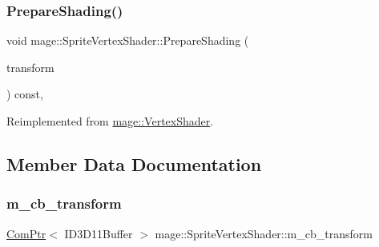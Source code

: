 \subsubsection{\texorpdfstring{Prepare\+Shading()}{PrepareShading()}}
{\footnotesize\ttfamily void mage\+::\+Sprite\+Vertex\+Shader\+::\+Prepare\+Shading (\begin{DoxyParamCaption}\item[{const X\+M\+M\+A\+T\+R\+IX \&}]{transform }\end{DoxyParamCaption}) const\hspace{0.3cm}{\ttfamily [override]}, {\ttfamily [virtual]}}



Reimplemented from \hyperlink{classmage_1_1_vertex_shader_a928e013248cf9c7cf17923bd6ff6a3e6}{mage\+::\+Vertex\+Shader}.



\subsection{Member Data Documentation}
\hypertarget{classmage_1_1_sprite_vertex_shader_a8d8f7c137da98c64d79d277400750637}{}\label{classmage_1_1_sprite_vertex_shader_a8d8f7c137da98c64d79d277400750637} 
\subsubsection{\texorpdfstring{m\+\_\+cb\+\_\+transform}{m\_cb\_transform}}
{\footnotesize\ttfamily \hyperlink{namespacemage_ae74f374780900893caa5555d1031fd79}{Com\+Ptr}$<$ I\+D3\+D11\+Buffer $>$ mage\+::\+Sprite\+Vertex\+Shader\+::m\+\_\+cb\+\_\+transform\hspace{0.3cm}{\ttfamily [private]}}

